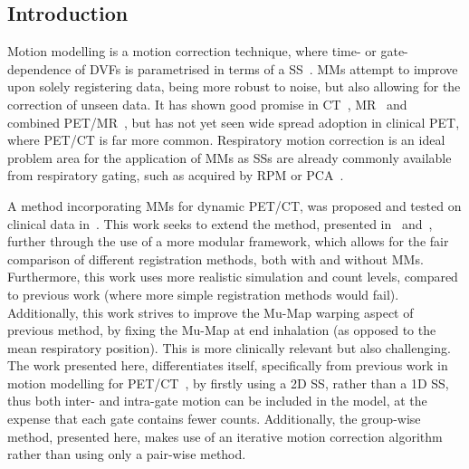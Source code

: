         \subsection{Introduction} \label{sec:comparison_of_motion_correction_methods_incorporating_motion_modelling_for_pet_ct_using_a_single_breath_hold_attenuation_map_introduction}
            Motion modelling is a motion correction technique, where time- or gate-dependence of \glspl{DVF} is parametrised in terms of a \gls{SS}~\parencite{McClelland2013}. \glspl{MM} attempt to improve upon solely registering data, being more robust to noise, but also allowing for the correction of unseen data. It has shown good promise in \gls{CT}~\parencite{Li2007EnhancedModel}, \gls{MR}~\parencite{Manke2002RespiratoryModels} and combined \gls{PET}/\gls{MR}~\parencite{Manber2016JointCorrection}, but has not yet seen wide spread adoption in clinical \gls{PET}, where \gls{PET}/\gls{CT} is far more common. Respiratory motion correction is an ideal problem area for the application of \glspl{MM} as \glspl{SS} are already commonly available from respiratory gating, such as acquired by \gls{RPM} or \gls{PCA}~\parencite{Thielemans2011}.
            
            A method incorporating \glspl{MM} for dynamic \gls{PET}/\gls{CT}, was proposed and tested on clinical data in~\parencite{Chan2018Non-RigidPET}. This work seeks to extend the method, presented in~ and~, further through the use of a more modular framework, which allows for the fair comparison of different registration methods, both with and without \glspl{MM}. Furthermore, this work uses more realistic simulation and count levels, compared to previous work (where more simple registration methods would fail). Additionally, this work strives to improve the \gls{Mu-Map} warping aspect of previous method, by fixing the \gls{Mu-Map} at end inhalation (as opposed to the mean respiratory position). This is more clinically relevant but also challenging. The work presented here, differentiates itself, specifically from previous work in motion modelling for \gls{PET}/\gls{CT}~\parencite{Chan2018Non-RigidPET}, by firstly using a \gls{2D} \gls{SS}, rather than a \gls{1D} \gls{SS}, thus both inter- and intra-gate motion can be included in the model, at the expense that each gate contains fewer counts. Additionally, the group-wise method, presented here, makes use of an iterative motion correction algorithm rather than using only a pair-wise method.
        
